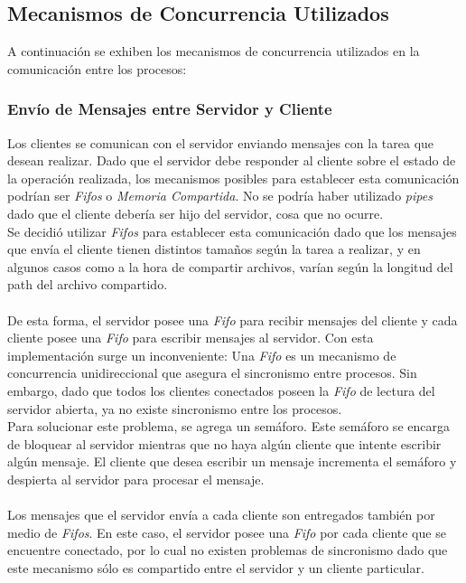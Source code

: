 \documentclass[a4paper,10pt]{article}
\begin{document}
	\subsection{Mecanismos de Concurrencia Utilizados}
		A continuaci\'on se exhiben los mecanismos de concurrencia utilizados en la comunicaci\'on entre los procesos:
		\subsubsection{Env\'io de Mensajes entre Servidor y Cliente}
			Los clientes se comunican con el servidor enviando mensajes con la tarea que desean realizar. Dado que el servidor 
			debe responder al cliente sobre el estado de la operaci\'on realizada, los mecanismos posibles para establecer esta 
			comunicaci\'on podr\'ian ser \emph{Fifos} o \emph{Memoria Compartida}. No se podr\'ia haber utilizado \emph{pipes} dado 
			que el cliente deber\'ia ser hijo del servidor, cosa que no ocurre. \\
			\indent Se decidi\'o utilizar \emph{Fifos} para establecer esta comunicaci\'on dado que los mensajes que env\'ia el cliente
			tienen distintos tama\~nos seg\'un la tarea a realizar, y en algunos casos como a la hora de compartir archivos, var\'ian 
			seg\'un la longitud del path del archivo compartido. \\ \\
			\indent De esta forma, el servidor posee una \emph{Fifo} para recibir mensajes del cliente y cada cliente posee una \emph{Fifo}
			para escribir mensajes al servidor. Con esta implementaci\'on surge un inconveniente: Una \emph{Fifo} es un mecanismo de 
			concurrencia unidireccional que asegura el sincronismo entre procesos. Sin embargo, dado que todos los clientes conectados poseen
			la \emph{Fifo} de lectura del servidor abierta, ya no existe sincronismo entre los procesos.  \\
			\indent Para solucionar este problema, se agrega un sem\'aforo. Este sem\'aforo se encarga de bloquear al servidor mientras que no 
			haya alg\'un cliente que intente escribir alg\'un mensaje. El cliente que desea escribir un mensaje incrementa el sem\'aforo y 
			despierta al servidor para procesar el mensaje. \\ \\
			\indent Los mensajes que el servidor env\'ia a cada cliente son entregados tambi\'en por medio de \emph{Fifos}. En este caso, el 
			servidor posee una \emph{Fifo} por cada cliente que se encuentre conectado, por lo cual no existen problemas de sincronismo dado que
			este mecanismo s\'olo es compartido entre el servidor y un cliente particular.
\end{document}
